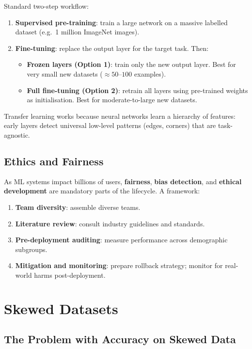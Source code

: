 Standard two-step workflow:
\begin{enumerate}
\item \textbf{Supervised pre-training}: train a large network on a massive
  labelled dataset (e.g.\ 1 million ImageNet images).
\item \textbf{Fine-tuning}: replace the output layer for the target task. Then:
  \begin{itemize}
  \item \textbf{Frozen layers (Option 1)}: train only the new output layer.
    Best for very small new datasets ($\approx50$--$100$ examples).
  \item \textbf{Full fine-tuning (Option 2)}: retrain all layers using
    pre-trained weights as initialisation. Best for moderate-to-large
    new datasets.
  \end{itemize}
\end{enumerate}

Transfer learning works because neural networks learn a hierarchy of features:
early layers detect universal low-level patterns (edges, corners) that are
task-agnostic.

\subsection{Ethics and Fairness}

As ML systems impact billions of users, \textbf{fairness}, \textbf{bias
detection}, and \textbf{ethical development} are mandatory parts of the
lifecycle. A framework:
\begin{enumerate}[label=\Roman*.]
\item \textbf{Team diversity}: assemble diverse teams.
\item \textbf{Literature review}: consult industry guidelines and standards.
\item \textbf{Pre-deployment auditing}: measure performance across demographic
  subgroups.
\item \textbf{Mitigation and monitoring}: prepare rollback strategy; monitor
  for real-world harms post-deployment.
\end{enumerate}

\section{Skewed Datasets}

\subsection{The Problem with Accuracy on Skewed Data}

